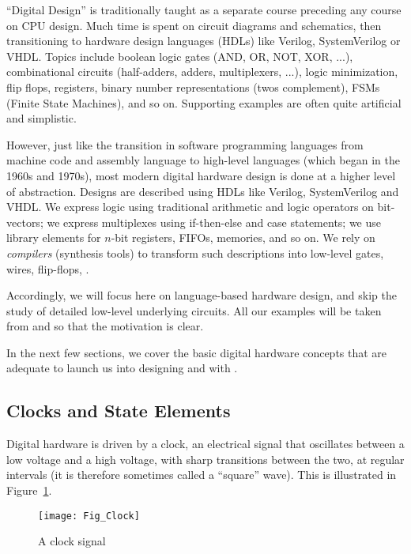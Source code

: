 ``Digital Design'' is traditionally taught as a separate course
preceding any course on CPU design.  Much time is spent on circuit
diagrams and schematics, then transitioning to hardware design
languages (HDLs) like Verilog, SystemVerilog or VHDL.  Topics include
boolean logic gates (AND, OR, NOT, XOR, ...), combinational circuits
(half-adders, adders, multiplexers, ...), logic minimization, flip
flops, registers, binary number representations (twos complement),
FSMs (Finite State Machines), and so on.  Supporting examples are
often quite artificial and simplistic.

However, just like the transition in software programming languages
from machine code and assembly language to high-level languages (which
began in the 1960s and 1970s), most modern digital hardware design is
done at a higher level of abstraction.  Designs are described using
HDLs like Verilog, SystemVerilog and VHDL.  We express logic using
traditional arithmetic and logic operators on bit-vectors; we express
multiplexes using if-then-else and case statements; we use library
elements for $n$-bit registers, FIFOs, memories, and so on.  We rely
on \emph{compilers} (synthesis tools) to transform such descriptions
into low-level gates, wires, flip-flops, {\etc}.

Accordingly, we will focus here on {\BSV} language-based hardware design,
and skip the study of detailed low-level underlying circuits.  All our
examples will be taken from {\DRUM} and {\FIFE} so that the motivation is
clear.

In the next few sections, we cover the basic digital hardware concepts
that are adequate to launch us into designing {\DRUM} and {\FIFE} with {\BSV}.


\subsection{Clocks and State Elements}

Digital hardware is driven by a clock, an electrical signal that
oscillates between a low voltage and a high voltage, with sharp
transitions between the two, at regular intervals (it is therefore
sometimes called a ``square'' wave).  This is illustrated in
Figure~\ref{Fig_Clock_1}.

\begin{figure}[htbp]
  \centerline{\texttt{[image: Fig\_Clock]}}
  \caption{\label{Fig_Clock_1}A clock signal}
\end{figure}

